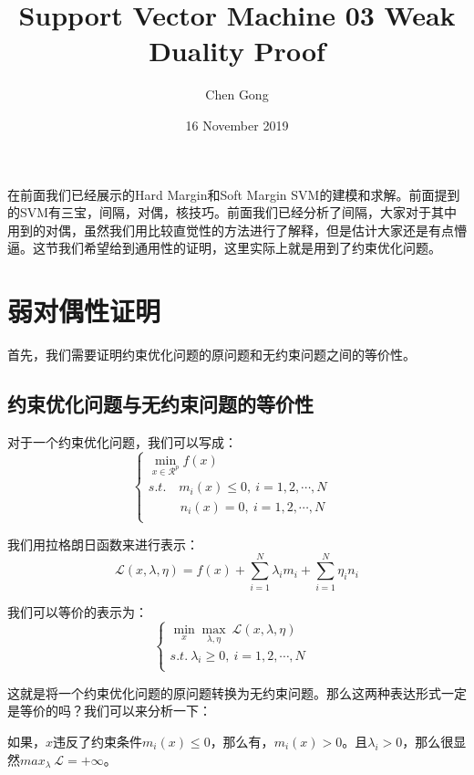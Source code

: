 \documentclass[a4paper]{article}
\title{Support Vector Machine 03 Weak Duality Proof}
\author{Chen Gong}
\date{16 November 2019}
\begin{document}
\maketitle
在前面我们已经展示的Hard Margin和Soft Margin SVM的建模和求解。前面提到的SVM有三宝，间隔，对偶，核技巧。前面我们已经分析了间隔，大家对于其中用到的对偶，虽然我们用比较直觉性的方法进行了解释，但是估计大家还是有点懵逼。这节我们希望给到通用性的证明，这里实际上就是用到了约束优化问题。

\section{弱对偶性证明}
首先，我们需要证明约束优化问题的原问题和无约束问题之间的等价性。
\subsection{约束优化问题与无约束问题的等价性}
对于一个约束优化问题，我们可以写成：
\begin{equation}
    \left\{
    \begin{array}{ll}
      \min_{x\in \mathcal{R}^p}f(x) & \\
      s.t. \quad m_i(x) \leq 0,\ i = 1,2,\cdots,N & \\
      \quad \ \; \quad n_i(x) = 0,\ i = 1,2,\cdots,N & \\
    \end{array}
    \right.
\end{equation}

我们用拉格朗日函数来进行表示：
\begin{equation}
    \mathcal{L}(x,\lambda,\eta) = f(x) + \sum_{i=1}^N\lambda_im_i + \sum_{i=1}^N\eta_in_i
\end{equation}

我们可以等价的表示为：
\begin{equation}
    \left\{
    \begin{array}{ll}
      \min_{x}\max_{\lambda,\eta}\  \mathcal{L}(x,\lambda,\eta) & \\
      s.t. \ \lambda_i \geq 0,\ i = 1,2,\cdots,N & \\
    \end{array}
    \right.
\end{equation}

这就是将一个约束优化问题的原问题转换为无约束问题。那么这两种表达形式一定是等价的吗？我们可以来分析一下：

如果，$x$违反了约束条件$m_i(x) \leq 0$，那么有，$m_i(x) > 0$。且$\lambda_i>0$，那么很显然$max_{\lambda}\ \mathcal{L} = + \infty$。
\end{document}
